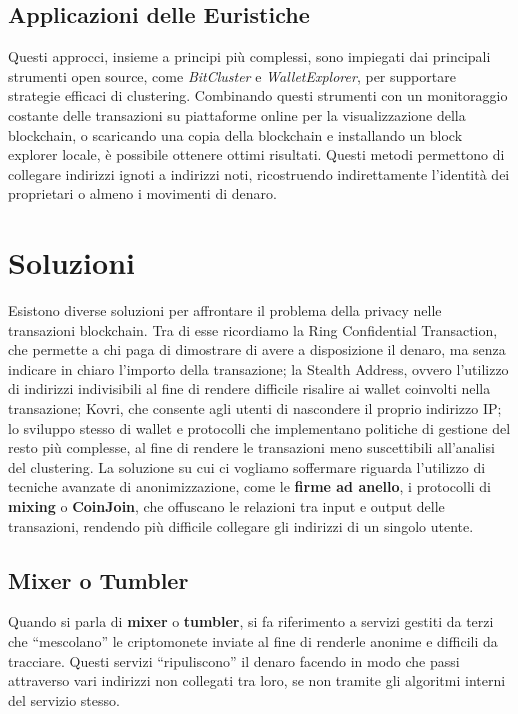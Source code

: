 \subsection{Applicazioni delle Euristiche}
Questi approcci, insieme a principi più complessi, sono impiegati dai principali strumenti open source, come \textit{BitCluster} e \textit{WalletExplorer}, per supportare strategie efficaci di clustering. Combinando questi strumenti con un monitoraggio costante delle transazioni su piattaforme online per la visualizzazione della blockchain, o scaricando una copia della blockchain e installando un block explorer locale, è possibile ottenere ottimi risultati. Questi metodi permettono di collegare indirizzi ignoti a indirizzi noti, ricostruendo indirettamente l'identità dei proprietari o almeno i movimenti di denaro.

\section{Soluzioni}
Esistono diverse soluzioni per affrontare il problema della privacy nelle transazioni blockchain. Tra di esse ricordiamo la Ring Confidential Transaction, che permette a chi paga di dimostrare di avere a disposizione il denaro, ma senza indicare in chiaro l'importo della transazione; la Stealth Address, ovvero l'utilizzo di indirizzi indivisibili al fine di rendere difficile risalire ai wallet coinvolti nella transazione; Kovri, che consente agli utenti di nascondere il proprio indirizzo IP; lo sviluppo stesso di wallet e protocolli che implementano politiche di gestione del resto più complesse, al fine di rendere le transazioni meno suscettibili all'analisi del clustering. La soluzione su cui ci vogliamo soffermare riguarda l'utilizzo di tecniche avanzate di anonimizzazione, come le \textbf{firme ad anello}, i protocolli di \textbf{mixing} o \textbf{CoinJoin}, che offuscano le relazioni tra input e output delle transazioni, rendendo più difficile collegare gli indirizzi di un singolo utente.

\subsection{Mixer o Tumbler}
Quando si parla di \textbf{mixer} o \textbf{tumbler}, si fa riferimento a servizi gestiti da terzi che “mescolano” le criptomonete inviate al fine di renderle anonime e difficili da tracciare. Questi servizi “ripuliscono” il denaro facendo in modo che passi attraverso vari indirizzi non collegati tra loro, se non tramite gli algoritmi interni del servizio stesso.

